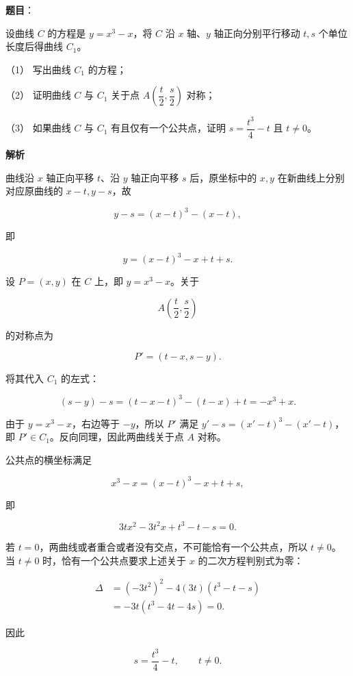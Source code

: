 \begin{answer}

\textbf{题目}：

设曲线 $C$ 的方程是 $y=x^3-x$，将 $C$ 沿 $x$ 轴、$y$ 轴正向分别平行移动 $t,s$ 个单位长度后得曲线 $C_1$。

（1） 写出曲线 $C_1$ 的方程；

（2） 证明曲线 $C$ 与 $C_1$ 关于点 $A\left(\dfrac t2,\dfrac s2\right)$ 对称；

（3） 如果曲线 $C$ 与 $C_1$ 有且仅有一个公共点，证明 $s=\dfrac{t^3}{4}-t$ 且 $t\neq0$。

\textbf{解析}


曲线沿 $x$ 轴正向平移 $t$、沿 $y$ 轴正向平移 $s$ 后，原坐标中的 $x,y$ 在新曲线上分别对应原曲线的 $x-t,y-s$，故

\nopagebreak[4]
\[
y-s=(x-t)^3-(x-t),
\]

即

\nopagebreak[4]
\[
y=(x-t)^3-x+t+s.
\]


设 $P=(x,y)$ 在 $C$ 上，即 $y=x^3-x$。关于

\nopagebreak[4]
\[
A\left(\frac t2,\frac s2\right)
\]

的对称点为

\nopagebreak[4]
\[
P'=(t-x,s-y).
\]

将其代入 $C_1$ 的左式：

\nopagebreak[4]
\[
(s-y)-s=(t-x-t)^3-(t-x)+t
=-x^3+x.
\]

由于 $y=x^3-x$，右边等于 $-y$，所以 $P'$ 满足 $y'-s=(x'-t)^3-(x'-t)$，即 $P'\in C_1$。反向同理，因此两曲线关于点 $A$ 对称。


公共点的横坐标满足

\nopagebreak[4]
\[
x^3-x=(x-t)^3-x+t+s,
\]

即

\nopagebreak[4]
\[
3tx^2-3t^2x+t^3-t-s=0.
\]

若 $t=0$，两曲线或者重合或者没有交点，不可能恰有一个公共点，所以 $t\neq0$。当 $t\neq0$ 时，恰有一个公共点要求上述关于 $x$ 的二次方程判别式为零：

\nopagebreak[4]
\[
\begin{aligned}
\Delta
&=(-3t^2)^2-4(3t)(t^3-t-s)\\
&=-3t(t^3-4t-4s)=0.
\end{aligned}
\]

因此

\nopagebreak[4]
\[
s=\frac{t^3}{4}-t,\qquad t\neq0.
\]




\end{answer}
